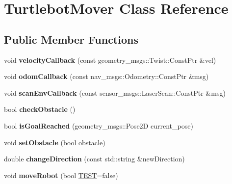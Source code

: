 \hypertarget{class_turtlebot_mover}{}\section{Turtlebot\+Mover Class Reference}
\label{class_turtlebot_mover}
\subsection*{Public Member Functions}
\begin{DoxyCompactItemize}
\item 
\mbox{\label{class_turtlebot_mover_a0d0a5b8a08a572c068ec20a51d00b91d}} 
void {\bfseries velocity\+Callback} (const geometry\+\_\+msgs\+::\+Twist\+::\+Const\+Ptr \&vel)
\item 
\mbox{\label{class_turtlebot_mover_a3ea420d241c35e583c2242593c2282f8}} 
void {\bfseries odom\+Callback} (const nav\+\_\+msgs\+::\+Odometry\+::\+Const\+Ptr \&msg)
\item 
\mbox{\label{class_turtlebot_mover_aced70fbf3afb61894501fa3f825ce40c}} 
void {\bfseries scan\+Env\+Callback} (const sensor\+\_\+msgs\+::\+Laser\+Scan\+::\+Const\+Ptr \&msg)
\item 
\mbox{\label{class_turtlebot_mover_a4a62dd85e7bb74768270e458129702c2}} 
bool {\bfseries check\+Obstacle} ()
\item 
\mbox{\label{class_turtlebot_mover_a07d1da1da224a125dab55cbc4dc11fcb}} 
bool {\bfseries is\+Goal\+Reached} (geometry\+\_\+msgs\+::\+Pose2D current\+\_\+pose)
\item 
\mbox{\label{class_turtlebot_mover_a75b47886fd146b5908a5eceae9577cd7}} 
void {\bfseries set\+Obstacle} (bool obstacle)
\item 
\mbox{\label{class_turtlebot_mover_ab0bc785e3718aafc52baba552dda3896}} 
double {\bfseries change\+Direction} (const std\+::string \&new\+Direction)
\item 
\mbox{\label{class_turtlebot_mover_a56d7f676bbe756b6c1869636896257da}} 
void {\bfseries move\+Robot} (bool \hyperlink{mover_test_8cpp_a623261ba51a174145109c15aadc6e5dd}{T\+E\+ST}=false)
\end{DoxyCompactItemize}
